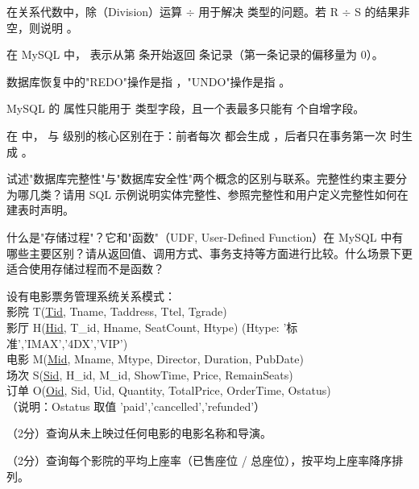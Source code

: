 \documentclass[a4paper,11pt]{article}
\begin{document}

\q 在关系代数中，除（Division）运算 $\div$ 用于解决 \fillblank 类型的问题。若 R $\div$ S 的结果非空，则说明 \fillblank 。

\q 在 MySQL 中， 表示从第 \fillblank 条开始返回 \fillblank 条记录（第一条记录的偏移量为 0）。

\q 数据库恢复中的"REDO"操作是指 \fillblank ，"UNDO"操作是指 \fillblank 。

\q MySQL 的  属性只能用于 \fillblank 类型字段，且一个表最多只能有 \fillblank 个自增字段。

\q 在  中， 与  级别的核心区别在于：前者每次  都会生成 \fillblank ，后者只在事务第一次  时生成 \fillblank 。


\q 试述"数据库完整性"与"数据库安全性"两个概念的区别与联系。完整性约束主要分为哪几类？请用 SQL 示例说明实体完整性、参照完整性和用户定义完整性如何在建表时声明。
\anslines{3cm}

\q 什么是"存储过程"？它和"函数"（UDF, User-Defined Function）在 MySQL 中有哪些主要区别？请从返回值、调用方式、事务支持等方面进行比较。什么场景下更适合使用存储过程而不是函数？
\anslines{3cm}


设有电影票务管理系统关系模式：\\
影院 T(\underline{Tid}, Tname, Taddress, Ttel, Tgrade)\\
影厅 H(\underline{Hid}, T\_id, Hname, SeatCount, Htype)  \hfill (Htype: '标准','IMAX','4DX','VIP')\\
电影 M(\underline{Mid}, Mname, Mtype, Director, Duration, PubDate)\\
场次 S(\underline{Sid}, H\_id, M\_id, ShowTime, Price, RemainSeats)\\
订单 O(\underline{Oid}, Sid, Uid, Quantity, TotalPrice, OrderTime, Ostatus)\\
（说明：Ostatus 取值 'paid','cancelled','refunded'）

\q （2分）查询从未上映过任何电影的电影名称和导演。
\anslines{1cm}

\q （2分）查询每个影院的平均上座率（已售座位 / 总座位），按平均上座率降序排列。
\anslines{1.2cm}
\end{document}
